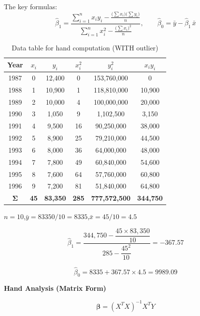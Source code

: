 \documentclass[12pt,a4paper]{article}
\begin{document}
The key formulas:
\begin{equation}
  \hat{\beta}_1 = \frac{\displaystyle\sum_{i=1}^{n} x_i y_i - \frac{\bigl(\sum x_i\bigr)\bigl(\sum y_i\bigr)}{n}}
                       {\displaystyle\sum_{i=1}^{n} x_i^2 - \frac{\bigl(\sum x_i\bigr)^2}{n}},
  \qquad
  \hat{\beta}_0 = \bar{y} - \hat{\beta}_1\,\bar{x}
\end{equation}

\begin{table}[H]
\centering
\caption{Data table for hand computation (WITH outlier)}
\begin{tabular}{cccccc}
\toprule
\textbf{Year} & $x_i$ & $y_i$ & $x_i^2$ & $y_i^2$ & $x_i y_i$ \\
\midrule
1987 & 0  & 12,400 & 0   & 153,760,000     & 0       \\
1988 & 1  & 10,900 & 1   & 118,810,000     & 10,900  \\
1989 & 2  & 10,000 & 4   & 100,000,000     & 20,000  \\
1990 & 3  & 1,050  & 9   & 1,102,500       & 3,150   \\
1991 & 4  & 9,500  & 16  & 90,250,000      & 38,000  \\
1992 & 5  & 8,900  & 25  & 79,210,000      & 44,500  \\
1993 & 6  & 8,000  & 36  & 64,000,000      & 48,000  \\
1994 & 7  & 7,800  & 49  & 60,840,000      & 54,600  \\
1995 & 8  & 7,600  & 64  & 57,760,000      & 60,800  \\
1996 & 9  & 7,200  & 81  & 51,840,000      & 64,800  \\
\midrule
$\boldsymbol{\Sigma}$ & \textbf{45} & \textbf{83,350} & \textbf{285} & \textbf{777,572,500} & \textbf{344,750} \\
\bottomrule
\end{tabular}
\end{table}

$n = 10$,\quad $\bar{y} = 83350/10 = 8335$,\quad $\bar{x} = 45/10 = 4.5$

\[
\hat{\beta}_1 = \frac{344{,}750 - \dfrac{45 \times 83{,}350}{10}}{285 - \dfrac{45^2}{10}} = -367.57
\]

\[
\hat{\beta}_0 = 8335 + 367.57 \times 4.5 = 9989.09
\]

\textbf{Hand Analysis (Matrix Form)}

\[
\bm{\beta} = (X^T X)^{-1} X^T Y
\]
\end{document}

